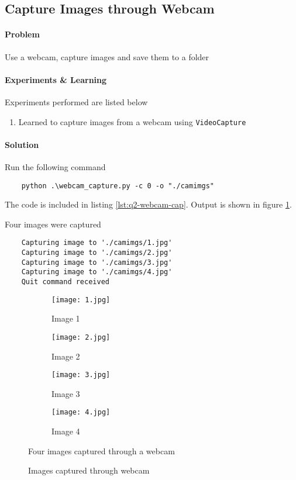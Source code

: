 \subsection{Capture Images through Webcam}

\paragraph{Problem}
Use a webcam, capture images and save them to a folder

\paragraph{Experiments \& Learning} Experiments performed are listed below

\begin{enumerate}
    \item Learned to capture images from a webcam using \texttt{VideoCapture}
\end{enumerate}

\paragraph{Solution}
Run the following command

\begin{verbatim}
    python .\webcam_capture.py -c 0 -o "./camimgs"
\end{verbatim}

The code is included in listing \ref{lst:q2-webcam-cap}. Output is shown in figure \ref{fig:q2-webcam-imgs}.



Four images were captured 

\begin{verbatim}
    Capturing image to './camimgs/1.jpg'
    Capturing image to './camimgs/2.jpg'
    Capturing image to './camimgs/3.jpg'
    Capturing image to './camimgs/4.jpg'
    Quit command received
\end{verbatim}

\begin{figure}[t]
    \centering
    \begin{subfigure}[b]{0.45\textwidth}
        \texttt{[image: 1.jpg]}
        \caption{Image 1}
    \end{subfigure}
    \begin{subfigure}[b]{0.45\textwidth}
        \texttt{[image: 2.jpg]}
        \caption{Image 2}
    \end{subfigure}
    \begin{subfigure}[b]{0.45\textwidth}
        \texttt{[image: 3.jpg]}
        \caption{Image 3}
    \end{subfigure}
    \begin{subfigure}[b]{0.45\textwidth}
        \texttt{[image: 4.jpg]}
        \caption{Image 4}
    \end{subfigure}
    \caption{Images captured through webcam}
    \label{fig:q2-webcam-imgs}
    \small
        Four images captured through a webcam
\end{figure}
